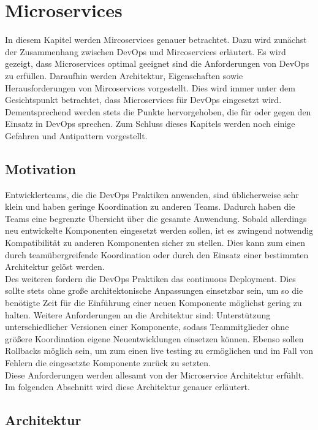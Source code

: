 \section{Microservices}
In diesem Kapitel werden Mircoservices genauer betrachtet. Dazu wird zunächst der Zusammenhang zwischen DevOps und Mircoservices erläutert. Es wird gezeigt, dass Microservices optimal geeignet sind die Anforderungen von DevOps zu erfüllen. Daraufhin werden Architektur, Eigenschaften sowie Herausforderungen von Mircoservices vorgestellt. Dies wird immer unter dem Gesichtspunkt betrachtet, dass Microservices für DevOps eingesetzt wird. Dementsprechend werden stets die Punkte hervorgehoben, die für oder gegen den Einsatz in DevOps sprechen. Zum Schluss dieses Kapitels werden noch einige Gefahren und Antipattern vorgestellt.

\subsection{Motivation}

Entwicklerteams, die die DevOps Praktiken anwenden, sind üblicherweise sehr klein und haben geringe Koordination zu anderen Teams. Dadurch haben die Teams eine begrenzte Übersicht über die gesamte Anwendung. Sobald allerdings neu entwickelte Komponenten eingesetzt werden sollen, ist es zwingend notwendig Kompatibilität zu anderen Komponenten sicher zu stellen. Dies kann zum einen durch teamübergreifende Koordination oder durch den Einsatz einer bestimmten Architektur gelöst werden. \\
Des weiteren fordern die DevOps Praktiken das continuous Deployment. Dies sollte stets ohne große architektonische Anpassungen einsetzbar sein, um so die benötigte Zeit für die Einführung einer neuen Komponente möglichst gering zu halten. Weitere Anforderungen an die Architektur sind: Unterstützung unterschiedlicher Versionen einer Komponente, sodass Teammitglieder ohne größere Koordination eigene Neuentwicklungen einsetzen können. Ebenso sollen Rollbacks möglich sein, um zum einen live testing zu ermöglichen und im Fall von Fehlern die eingesetzte Komponente zurück zu setzten.\\

Diese Anforderungen werden allesamt von der Microservice Architektur erfühlt. Im folgenden Abschnitt wird diese Architektur genauer erläutert. 
 


\subsection{Architektur}

